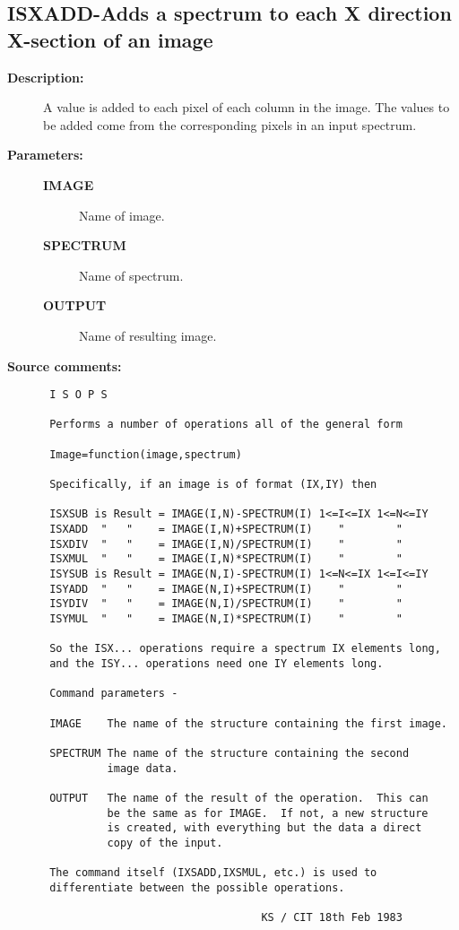 \subsection{ISXADD-\label{ISXADD}Adds a spectrum to each X direction X-section of an image}
\begin{description}

\item [{\bf Description:}]
 A value is added to each pixel of each column in the image.
 The values to be added come from the corresponding pixels in an
 input spectrum.

\item [{\bf Parameters:}]
\begin{description}
\item [{\bf IMAGE}]
 Name of image.
\item [{\bf SPECTRUM}]
 Name of spectrum.
\item [{\bf OUTPUT}]
 Name of resulting image.
\end{description}

\item [{\bf Source comments:}]
\begin{verbatim}
 I S O P S

 Performs a number of operations all of the general form

 Image=function(image,spectrum)

 Specifically, if an image is of format (IX,IY) then

 ISXSUB is Result = IMAGE(I,N)-SPECTRUM(I) 1<=I<=IX 1<=N<=IY
 ISXADD  "   "    = IMAGE(I,N)+SPECTRUM(I)    "        "
 ISXDIV  "   "    = IMAGE(I,N)/SPECTRUM(I)    "        "
 ISXMUL  "   "    = IMAGE(I,N)*SPECTRUM(I)    "        "
 ISYSUB is Result = IMAGE(N,I)-SPECTRUM(I) 1<=N<=IX 1<=I<=IY
 ISYADD  "   "    = IMAGE(N,I)+SPECTRUM(I)    "        "
 ISYDIV  "   "    = IMAGE(N,I)/SPECTRUM(I)    "        "
 ISYMUL  "   "    = IMAGE(N,I)*SPECTRUM(I)    "        "

 So the ISX... operations require a spectrum IX elements long,
 and the ISY... operations need one IY elements long.

 Command parameters -

 IMAGE    The name of the structure containing the first image.

 SPECTRUM The name of the structure containing the second
          image data.

 OUTPUT   The name of the result of the operation.  This can
          be the same as for IMAGE.  If not, a new structure
          is created, with everything but the data a direct
          copy of the input.

 The command itself (IXSADD,IXSMUL, etc.) is used to
 differentiate between the possible operations.

                                  KS / CIT 18th Feb 1983
\end{verbatim}
\end{description}
